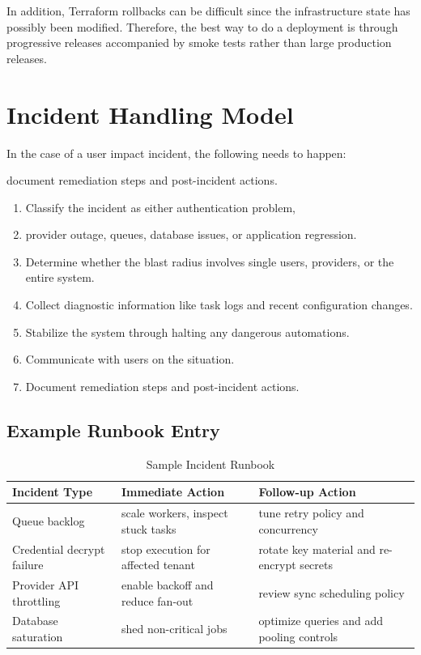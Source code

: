 In addition, Terraform rollbacks can be difficult since the infrastructure state has possibly been modified. Therefore, the best way to do a deployment is through progressive releases accompanied by smoke tests rather than large production releases.

\section{Incident Handling Model}
In the case of a user impact incident, the following needs to happen:
 




document remediation steps and post-incident actions.

\begin{enumerate}
    \item Classify the incident as either authentication problem,
    \item provider outage, queues, database issues, or application regression.
    \item Determine whether the blast radius involves single users, providers, or the entire system.
    \item Collect diagnostic information like task logs and recent configuration changes.
    \item Stabilize the system through halting any dangerous automations.
    \item Communicate with users on the situation.
    \item Document remediation steps and post-incident actions.
\end{enumerate}

\subsection{Example Runbook Entry}
\begin{table}[h]
\centering
\caption{Sample Incident Runbook}
\label{tab:incident_runbook}
\begin{tabular}{|p{3.0cm}|p{4.0cm}|p{4.4cm}|}
\hline
\textbf{Incident Type} & \textbf{Immediate Action} & \textbf{Follow-up Action} \\ \hline
Queue backlog & scale workers, inspect stuck tasks & tune retry policy and concurrency \\ \hline
Credential decrypt failure & stop execution for affected tenant & rotate key material and re-encrypt secrets \\ \hline
Provider API throttling & enable backoff and reduce fan-out & review sync scheduling policy \\ \hline
Database saturation & shed non-critical jobs & optimize queries and add pooling controls \\ \hline
\end{tabular}
\end{table}

